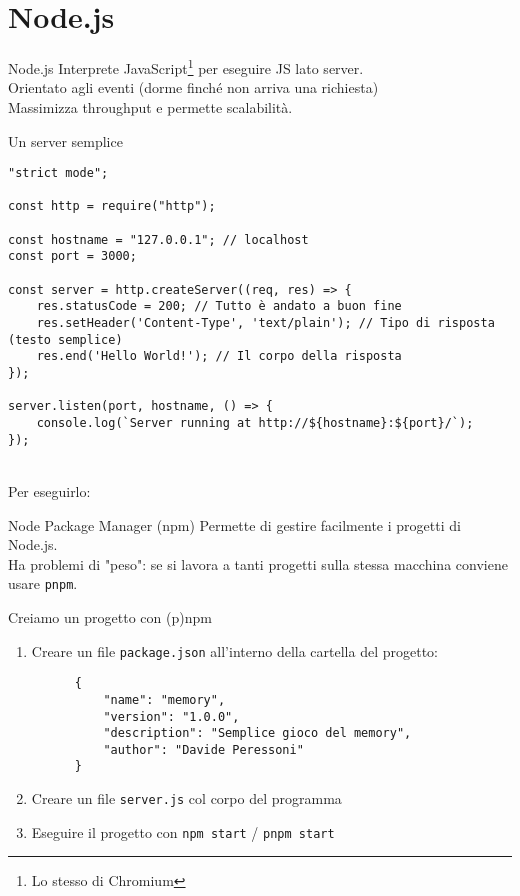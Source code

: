 \section{Node.js}
\begin{frame}{Node.js}\transfade\centering
  Interprete JavaScript\footnote{Lo stesso di Chromium} per eseguire JS lato server.\\\bigskip\pause
  Orientato agli eventi (dorme finché non arriva una richiesta)
  \\\pause
  Massimizza throughput e permette scalabilità.\\
\end{frame}

\begin{frame}[fragile]{Un server semplice}\transfade\centering
  \begin{verbatim}
"strict mode";

const http = require("http");

const hostname = "127.0.0.1"; // localhost
const port = 3000;

const server = http.createServer((req, res) => {
    res.statusCode = 200; // Tutto è andato a buon fine
    res.setHeader('Content-Type', 'text/plain'); // Tipo di risposta (testo semplice)
    res.end('Hello World!'); // Il corpo della risposta
});

server.listen(port, hostname, () => {
    console.log(`Server running at http://${hostname}:${port}/`);
});
  \end{verbatim}
  ~\\\bigskip
  Per eseguirlo: 
\end{frame}

\begin{frame}{Node Package Manager (npm)}\transfade\centering
  Permette di gestire facilmente i progetti di Node.js.\\\bigskip\pause
  Ha problemi di "peso": se si lavora a tanti progetti sulla stessa macchina conviene usare \texttt{pnpm}.\\
\end{frame}

\begin{frame}[fragile]{Creiamo un progetto con (p)npm}\transfade\centering
  \begin{enumerate}[<+->]
    \item Creare un file \texttt{package.json} all'interno della cartella del progetto:
    \begin{verbatim}
      {
          "name": "memory",
          "version": "1.0.0",
          "description": "Semplice gioco del memory",
          "author": "Davide Peressoni"
      }
    \end{verbatim}
    \item Creare un file \texttt{server.js} col corpo del programma
    \item Eseguire il progetto con \texttt{npm start} / \texttt{pnpm start}
  \end{enumerate}
\end{frame}

